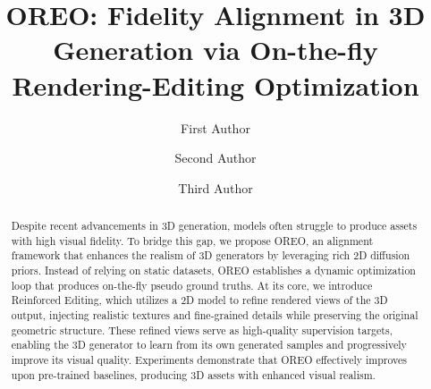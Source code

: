 \documentclass[runningheads]{llncs}
\begin{document}
\title{OREO: Fidelity Alignment in 3D Generation via On-the-fly Rendering-Editing Optimization}


\author{First Author \and
Second Author \and
Third Author}



\maketitle


\begin{abstract}
  Despite recent advancements in 3D generation, models often struggle to produce assets with high visual fidelity.
  To bridge this gap, we propose OREO, an alignment framework that enhances the realism of 3D generators by leveraging rich 2D diffusion priors.
  Instead of relying on static datasets, OREO establishes a dynamic optimization loop that produces on-the-fly pseudo ground truths.
  At its core, we introduce Reinforced Editing, which utilizes a 2D model to refine rendered views of the 3D output, injecting realistic textures and fine-grained details while preserving the original geometric structure.
  These refined views serve as high-quality supervision targets, enabling the 3D generator to learn from its own generated samples and progressively improve its visual quality.
  Experiments demonstrate that OREO effectively improves upon pre-trained baselines, producing 3D assets with enhanced visual realism.
\end{abstract}
\end{document}
